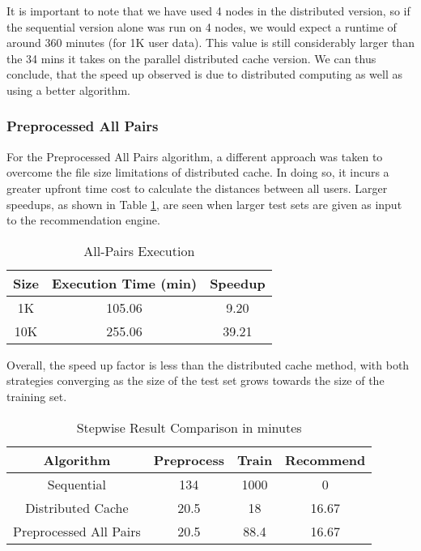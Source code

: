 \documentclass[conference, 12pt]{IEEEtran}
\begin{document}
It is important to note that we have used 4 nodes in the distributed version, so if the sequential version alone was run on 4 nodes, we would expect a runtime of around 360 minutes (for 1K user data). This value is still considerably larger than the 34 mins it takes on the parallel distributed cache version. We can thus conclude, that the speed up observed is due to distributed computing as well as using a better algorithm.


\subsubsection{Preprocessed All Pairs}

For the Preprocessed All Pairs algorithm, a different approach was taken to overcome the file size limitations of distributed cache.  In doing so, it incurs a greater upfront time cost to calculate the distances between all users.  Larger speedups, as shown in Table \ref{tb:all_pairs}, are seen when larger test sets are given as input to the recommendation engine.  

\begin{table}[h!]
\begin{center}
\begin{tabular}{|c|c|c|}
\hline
{\bf Size} & {\bf Execution Time (min)} & {\bf Speedup}\\
\hline
\hline
1K   & 105.06  & 9.20 \\
\hline
10K   & 255.06 & 39.21 \\
\hline

\end{tabular}
\caption{All-Pairs Execution}
\label{tb:all_pairs}
\end{center}
\end{table}
Overall, the speed up factor is less than the distributed cache method, with both strategies converging as the size of the test set grows towards the size of the training set. 
\begin{table}[h!]
\begin{center}
\begin{tabular}{|c|c|c|c|}
\hline
{\bf Algorithm} & {\bf Preprocess} & {\bf Train} &{\bf Recommend} \\
\hline
\hline
Sequential   & 134  & 1000 &  0 \\
\hline
Distributed Cache   & 20.5 & 18 & 16.67  \\
\hline
Preprocessed All Pairs   & 20.5 & 88.4 & 16.67  \\
\hline
\end{tabular}
\caption{Stepwise Result Comparison in minutes}
\label{tb:comparison}
\end{center}
\end{table}
 
\end{document}
